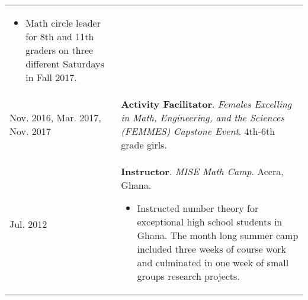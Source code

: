 \begin{center}
{\begin{longtable}{p{}  p{}}
        {\small
        \begin{itemize}
        \setlength{\parindent}{0em}
        \item[] Math circle leader for 8th and 11th graders on three different Saturdays in Fall 2017.
        \end{itemize}
        }
        \vspace{-1em}
         \\ 
 Nov.  2016,  Mar.  2017,  Nov.  2017 & \textbf{Activity Facilitator}. \textit{Females Excelling in Math, Engineering, and the Sciences (FEMMES) Capstone Event}.  4th-6th grade girls.  \\ 
 Jul.  2012 & \textbf{Instructor}. \textit{MISE Math Camp}.  Accra, Ghana. 
        \hspace{-1em}

        {\small
        \begin{itemize}
        \setlength{\parindent}{0em}
        \item[] Instructed number theory for exceptional high school students in Ghana. The month long summer camp included three weeks of course work and culminated in one week of small groups research projects.
        \end{itemize}
        }
        \vspace{-1em}
         
    \end{longtable}
    } 
    \end{center}

    \vspace{-1em}
    